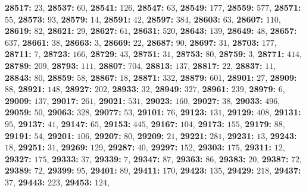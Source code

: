 \textsf{\bfseries 28517:} $23$, \textsf{\bfseries 28537:} $60$, \textsf{\bfseries 28541:} $126$, \textsf{\bfseries 28547:} $63$, \textsf{\bfseries 28549:} $177$, \textsf{\bfseries 28559:} $577$, \textsf{\bfseries 28571:} $55$, \textsf{\bfseries 28573:} $93$, \textsf{\bfseries 28579:} $14$, \textsf{\bfseries 28591:} $42$, \textsf{\bfseries 28597:} $384$, \textsf{\bfseries 28603:} $63$, \textsf{\bfseries 28607:} $110$, \textsf{\bfseries 28619:} $82$, \textsf{\bfseries 28621:} $29$, \textsf{\bfseries 28627:} $61$, \textsf{\bfseries 28631:} $520$, \textsf{\bfseries 28643:} $139$, \textsf{\bfseries 28649:} $48$, \textsf{\bfseries 28657:} $637$, \textsf{\bfseries 28661:} $38$, \textsf{\bfseries 28663:} $3$, \textsf{\bfseries 28669:} $22$, \textsf{\bfseries 28687:} $90$, \textsf{\bfseries 28697:} $31$, \textsf{\bfseries 28703:} $177$, \textsf{\bfseries 28711:} $7$, \textsf{\bfseries 28723:} $166$, \textsf{\bfseries 28729:} $43$, \textsf{\bfseries 28751:} $31$, \textsf{\bfseries 28753:} $80$, \textsf{\bfseries 28759:} $3$, \textsf{\bfseries 28771:} $414$, \textsf{\bfseries 28789:} $209$, \textsf{\bfseries 28793:} $111$, \textsf{\bfseries 28807:} $704$, \textsf{\bfseries 28813:} $137$, \textsf{\bfseries 28817:} $22$, \textsf{\bfseries 28837:} $11$, \textsf{\bfseries 28843:} $80$, \textsf{\bfseries 28859:} $58$, \textsf{\bfseries 28867:} $18$, \textsf{\bfseries 28871:} $332$, \textsf{\bfseries 28879:} $601$, \textsf{\bfseries 28901:} $27$, \textsf{\bfseries 28909:} $88$, \textsf{\bfseries 28921:} $148$, \textsf{\bfseries 28927:} $202$, \textsf{\bfseries 28933:} $32$, \textsf{\bfseries 28949:} $327$, \textsf{\bfseries 28961:} $239$, \textsf{\bfseries 28979:} $6$, \textsf{\bfseries 29009:} $137$, \textsf{\bfseries 29017:} $261$, \textsf{\bfseries 29021:} $531$, \textsf{\bfseries 29023:} $160$, \textsf{\bfseries 29027:} $38$, \textsf{\bfseries 29033:} $496$, \textsf{\bfseries 29059:} $50$, \textsf{\bfseries 29063:} $328$, \textsf{\bfseries 29077:} $53$, \textsf{\bfseries 29101:} $76$, \textsf{\bfseries 29123:} $131$, \textsf{\bfseries 29129:} $408$, \textsf{\bfseries 29131:} $95$, \textsf{\bfseries 29137:} $41$, \textsf{\bfseries 29147:} $65$, \textsf{\bfseries 29153:} $445$, \textsf{\bfseries 29167:} $104$, \textsf{\bfseries 29173:} $155$, \textsf{\bfseries 29179:} $88$, \textsf{\bfseries 29191:} $54$, \textsf{\bfseries 29201:} $106$, \textsf{\bfseries 29207:} $80$, \textsf{\bfseries 29209:} $21$, \textsf{\bfseries 29221:} $281$, \textsf{\bfseries 29231:} $13$, \textsf{\bfseries 29243:} $18$, \textsf{\bfseries 29251:} $31$, \textsf{\bfseries 29269:} $129$, \textsf{\bfseries 29287:} $40$, \textsf{\bfseries 29297:} $152$, \textsf{\bfseries 29303:} $175$, \textsf{\bfseries 29311:} $12$, \textsf{\bfseries 29327:} $175$, \textsf{\bfseries 29333:} $37$, \textsf{\bfseries 29339:} $7$, \textsf{\bfseries 29347:} $87$, \textsf{\bfseries 29363:} $86$, \textsf{\bfseries 29383:} $20$, \textsf{\bfseries 29387:} $72$, \textsf{\bfseries 29389:} $72$, \textsf{\bfseries 29399:} $95$, \textsf{\bfseries 29401:} $89$, \textsf{\bfseries 29411:} $170$, \textsf{\bfseries 29423:} $135$, \textsf{\bfseries 29429:} $218$, \textsf{\bfseries 29437:} $37$, \textsf{\bfseries 29443:} $223$, \textsf{\bfseries 29453:} $124$, 
